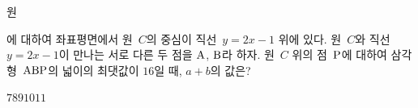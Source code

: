 원 \par\smallskip{}\par\smallskip\noindent 에 대하여 좌표평면에서 원~$C$의 중심이 직선~$y=2x-1$ 위에 있다. 원~$C$와 직선~$y=2x-1$이 만나는 서로 다른 두 점을 $\mathrm{A}$, $\mathrm{B}$라 하자. 원~$C$ 위의 점~$\mathrm{P}$에 대하여 삼각형~$\mathrm{ABP}$의 넓이의 최댓값이 $16$일 때, $a+b$의 값은? 
\begin{choices32}{$7$}{$8$}{$9$}{$10$}{$11$}\end{choices32}
